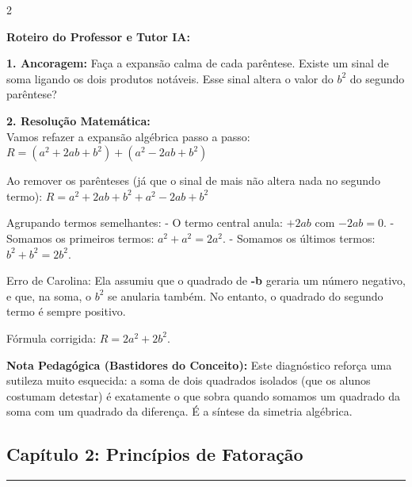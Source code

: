 \begin{multicols*}{2}
\ifgabarito
    \begin{tcolorbox}[colback=CorTitUm!5, colframe=CorTitUm, boxrule=1pt, arc=4pt, left=6pt, right=6pt, top=6pt, bottom=6pt]
    \small\textbf{\textcolor{CorTitUm}{Roteiro do Professor e Tutor IA:}}\par\vspace{0.1cm}
    \color{CinzaEscuro}
    \textbf{1. Ancoragem:} Faça a expansão calma de cada parêntese. Existe um sinal de soma ligando os dois produtos notáveis. Esse sinal altera o valor do $b^2$ do segundo parêntese?\par\vspace{0.1cm}
    \textbf{2. Resolução Matemática:}\\
    Vamos refazer a expansão algébrica passo a passo:
    $ R = (a^2 + 2ab + b^2) + (a^2 - 2ab + b^2) $
    
    Ao remover os parênteses (já que o sinal de mais não altera nada no segundo termo):
    $ R = a^2 + 2ab + b^2 + a^2 - 2ab + b^2 $
    
    Agrupando termos semelhantes:
    - O termo central anula: $ +2ab $ com $ -2ab = 0 $.
    - Somamos os primeiros termos: $ a^2 + a^2 = 2a^2 $.
    - Somamos os últimos termos: $ b^2 + b^2 = 2b^2 $.
    
    Erro de Carolina: Ela assumiu que o quadrado de \textbf{-b} geraria um número negativo, e que, na soma, o $b^2$ se anularia também. No entanto, o quadrado do segundo termo é sempre positivo.
    
    Fórmula corrigida: $ R = 2a^2 + 2b^2 $.
    \end{tcolorbox}
    \vspace{0.15cm}
    
    \begin{boxexplicacao}
    \textbf{Nota Pedagógica (Bastidores do Conceito):} Este diagnóstico reforça uma sutileza muito esquecida: a soma de dois quadrados isolados (que os alunos costumam detestar) é exatamente o que sobra quando somamos um quadrado da soma com um quadrado da diferença. É a síntese da simetria algébrica.
    \end{boxexplicacao}
\fi

\par\vspace{\espacoQuestao}


\subsection*{Capítulo 2: Princípios de Fatoração}
\vspace{-0.2cm}\noindent\rule{\linewidth}{1.5pt} 
\par\vspace{\espacoPosTitulo}

\end{multicols*}
